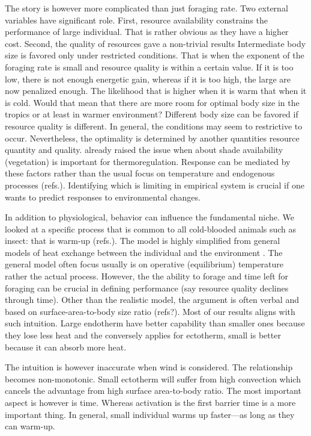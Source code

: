 The story is however more complicated than just foraging rate.
 Two external variables have significant role.
 First, resource availability constrains the performance of large individual.
 That is rather obvious as they have a higher cost.
 Second, the quality of resources gave a non-trivial results
 Intermediate body size is favored only under restricted conditions. 
 That is when the exponent of the foraging rate is small and resource quality is within a certain value.
 If it is too low, there is not enough energetic gain, whereas if it is too high, the large are now penalized enough.
 The likelihood that is higher when it is warm that when it is cold. 
 Would that mean that there are more room for optimal  body size in the tropics or at least in warmer environment?%
 Different body size can be favored if resource quality is different.
 In general, the conditions may seem to restrictive to occur.
 Nevertheless, the optimality is determined by another quantities resource quantity and quality.
 \citet{Kearney2009b} already raised the issue when about shade availability (vegetation) is important for thermoregulation.
  Response can be mediated by these factors  rather than the usual focus on temperature and endogenous processes (refs.).
 Identifying which is limiting in empirical system is crucial if one wants to predict responses to environmental changes.

In addition to physiological, behavior can influence the fundamental niche.
We looked at a specific process that is common to all cold-blooded animals such as insect: that is warm-up (refs.).
The model is highly simplified from general models of heat exchange between the individual and the environment \citep[e.g.,][]{Campbell2012}.
The general model often focus usually is on operative (equilibrium) temperature \citep[e.g.]{Angilletta2009} rather the actual process.
However, the the ability to forage and time left for foraging can be crucial in defining performance (say resource quality declines through time).
Other than the realistic model, the argument is often verbal and based on surface-area-to-body size ratio (refs?).
Most of our results aligns with  such intuition. 
Large endotherm have better capability than smaller ones because they lose less heat and the conversely applies for ectotherm, small is better because it can absorb more heat.

The intuition is however inaccurate when wind is considered. 
The relationship becomes non-monotonic. 
Small ectotherm will suffer from high convection which cancels the advantage from high surface area-to-body ratio.
The most important aspect is however is time.
Whereas activation is the first barrier time is a more important thing.
In general, small individual warms up faster---as long as they can warm-up. 


